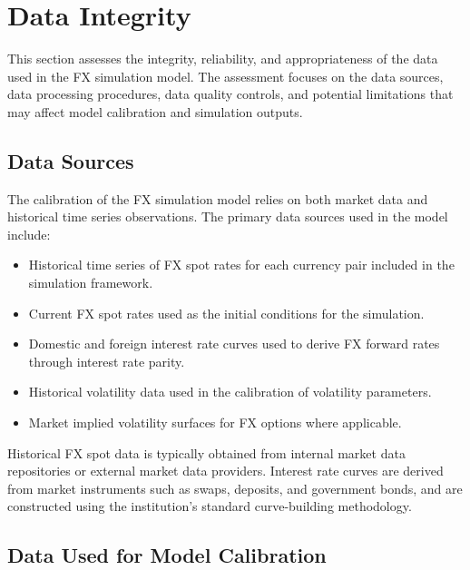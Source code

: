 \section{Data Integrity}\label{DataIntegrity}
 

This section assesses the integrity, reliability, and appropriateness of the data used in the FX simulation model. The assessment focuses on the data sources, data processing procedures, data quality controls, and potential limitations that may affect model calibration and simulation outputs.

\subsection{Data Sources}

The calibration of the FX simulation model relies on both market data and historical time series observations. The primary data sources used in the model include:

\begin{itemize}
	
	\item Historical time series of FX spot rates for each currency pair included in the simulation framework.
	
	\item Current FX spot rates used as the initial conditions for the simulation.
	
	\item Domestic and foreign interest rate curves used to derive FX forward rates through interest rate parity.
	
	\item Historical volatility data used in the calibration of volatility parameters.
	
	\item Market implied volatility surfaces for FX options where applicable.
	
\end{itemize}

Historical FX spot data is typically obtained from internal market data repositories or external market data providers. Interest rate curves are derived from market instruments such as swaps, deposits, and government bonds, and are constructed using the institution's standard curve-building methodology.

\subsection{Data Used for Model Calibration}

